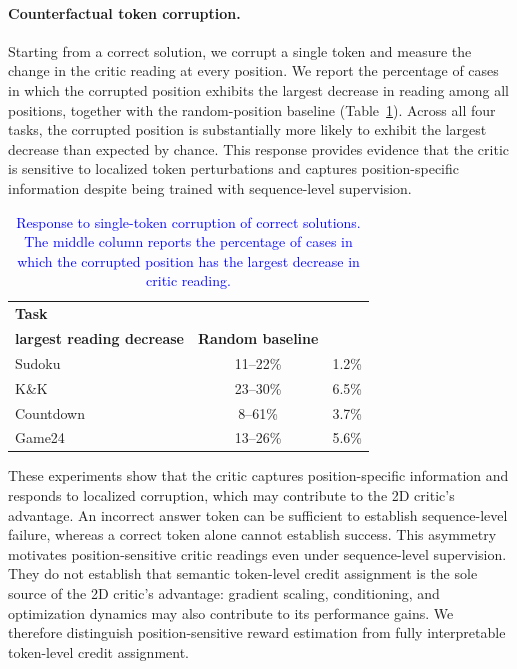 \paragraph{Counterfactual token corruption.}
Starting from a correct solution, we corrupt a single token and measure the change in the critic reading at every position. We report the percentage of cases in which the corrupted position exhibits the largest decrease in reading among all positions, together with the random-position baseline (Table~\ref{tab:critic_token_corruption}). Across all four tasks, the corrupted position is substantially more likely to exhibit the largest decrease than expected by chance. This response provides evidence that the critic is sensitive to localized token perturbations and captures position-specific information despite being trained with sequence-level supervision.

\begin{table}[H]
\centering\small\color{blue}
\caption{\textcolor{blue}{Response to single-token corruption of correct solutions. The middle column reports the percentage of cases in which the corrupted position has the largest decrease in critic reading.}}
\label{tab:critic_token_corruption}
\begin{tabular}{@{}lcc@{}}
\toprule
\textbf{Task} & \shortstack{\textbf{Corrupted position with}\\\textbf{largest reading decrease}} & \textbf{Random baseline} \\
\midrule
Sudoku & 11--22\% & 1.2\% \\
K\&K & 23--30\% & 6.5\% \\
Countdown & 8--61\% & 3.7\% \\
Game24 & 13--26\% & 5.6\% \\
\bottomrule
\end{tabular}
\end{table}


These experiments show that the critic captures position-specific information and responds to localized corruption, which may contribute to the 2D critic's advantage. An incorrect answer token can be sufficient to establish sequence-level failure, whereas a correct token alone cannot establish success. This asymmetry motivates position-sensitive critic readings even under sequence-level supervision. They do not establish that semantic token-level credit assignment is the sole source of the 2D critic's advantage: gradient scaling, conditioning, and optimization dynamics may also contribute to its performance gains. We therefore distinguish position-sensitive reward estimation from fully interpretable token-level credit assignment.
\endgroup

